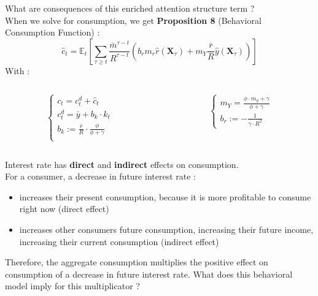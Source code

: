 \documentclass{beamer}
\begin{document}
\begin{frame}{\subsecname}
    What are consequences of this enriched attention structure term ? \\
    When we solve for consumption, we get \textbf{Proposition 8} (Behavioral Consumption Function) :
    \begin{equation}\tag{52}
        \hat{c}_{t}=\mathbb{E}_{t}\left[\sum_{\tau\geq t}\frac{\bar{m}^{\tau-t}}{R^{\tau-t}}\left(b_{r}m_{r}\hat{r}(\textbf{X}_{\tau})+m_{Y}\frac{\bar{r}}{R}\hat{y}(\textbf{X}_{\tau})\right)\right]
    \end{equation}
    With :
    \begin{columns}
        \begin{column}{0.5\textwidth}
            \begin{equation*}
                \begin{cases}
                    c_{t}=c_{t}^{d}+\hat{c}_{t} \\ 
                    c^{d}_{t} = \bar{y} + b_{k}\cdot k_{t} \\
                    b_{k}:=\frac{\bar{r}}{R}\cdot\frac{\phi}{\phi+\gamma} \\ 
                \end{cases}
            \end{equation*}
        \end{column}
        \begin{column}{0.5\textwidth}  %
             \begin{equation*}
                \begin{cases}
                    m_{Y}=\frac{\phi\cdot m_{y}+\gamma}{\phi+\gamma} \\
                    b_{r}:=-\frac{1}{\gamma\cdot R^{2}}
                \end{cases}
             \end{equation*}
        \end{column}
    \end{columns}
\end{frame}

\begin{frame}{\subsecname}
    Interest rate has \textbf{direct} and \textbf{indirect} effects on consumption. \\ 
    For a consumer, a decrease in future interest rate : 
    \begin{itemize}
        \item increases their present consumption, because it is more profitable to consume right now (direct effect)
        \item increases other consumers future consumption, increasing their future income, increasing their current consumption (indirect effect)
    \end{itemize}
    Therefore, the aggregate consumption multiplies the positive effect on consumption of a decrease in future interest rate. 
    What does this behavioral model imply for this multiplicator ?
\end{frame}
\end{document}

